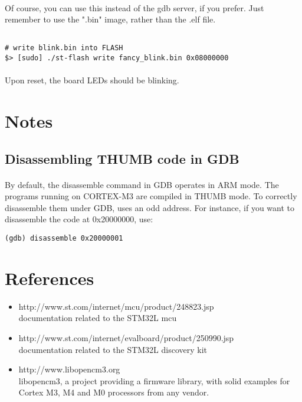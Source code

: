 \documentclass[a4paper, 11pt]{article}
\begin{document}
\paragraph{}
Of course, you can use this instead of the gdb server, if you prefer.  Just remember
to use the ".bin" image, rather than the .elf file.\\
\begin{small}
\begin{lstlisting}[frame=tb]

# write blink.bin into FLASH
$> [sudo] ./st-flash write fancy_blink.bin 0x08000000
\end{lstlisting}
\end{small}

\paragraph{}
Upon reset, the board LEDs should be blinking.

\newpage
\section{Notes}

\subsection{Disassembling THUMB code in GDB}
\paragraph{}
By default, the disassemble command in GDB operates in ARM mode. The programs running on CORTEX-M3
are compiled in THUMB mode. To correctly disassemble them under GDB, uses an odd address. For instance,
if you want to disassemble the code at 0x20000000, use:\\
\begin{small}
\begin{lstlisting}[frame=tb]
(gdb) disassemble 0x20000001
\end{lstlisting}
\end{small}


\newpage
\section{References}
\begin{itemize}
\item http://www.st.com/internet/mcu/product/248823.jsp\\
  documentation related to the STM32L mcu
\item http://www.st.com/internet/evalboard/product/250990.jsp\\
  documentation related to the STM32L discovery kit
\item http://www.libopencm3.org\\
  libopencm3, a project providing a firmware library, with solid examples for Cortex
  M3, M4 and M0 processors from any vendor.
\end{itemize}
\end{document}
